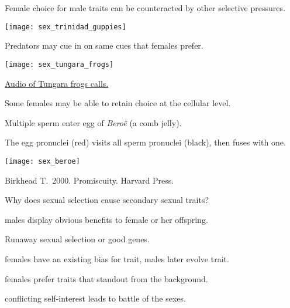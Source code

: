 \documentclass[t]{beamer}
\newcommand{\backskip}{\vspace{-0.5\baselineskip}}
\begin{document}

\begin{frame}{Female choice for male traits can be counteracted by other selective pressures.}

\backskip

\texttt{[image: sex\_trinidad\_guppies]}

\end{frame}


\begin{frame}{Predators may cue in on same cues that females prefer.}

\texttt{[image: sex\_tungara\_frogs]}

\tinyfill \href{https://www.smithsonianmag.com/science-nature/frogs-mating-call-also-attracts-predators-180949463/}{Audio of Tungara frogs calls.}
\end{frame}


\begin{frame}{Some females may be able to retain choice at the cellular level.}

\backskip

\begin{multicols}{2}

\hangpara Multiple sperm enter egg of \textit{Beroë} (a comb jelly).

\hangpara The egg pronuclei (red) visits all sperm pronuclei (black), then fuses with one.

\columnbreak

\vspace*{-2.5\baselineskip}\texttt{[image: sex\_beroe]}

\end{multicols}

\vfilll

\tiny Birkhead T.~2000. Promiscuity. Harvard Press.

\end{frame}


\begin{frame}{Why does sexual selection cause secondary sexual traits?}

\hangpara {} males display obvious benefits to female or her offspring.

\hangpara {} Runaway sexual selection or good genes.

\hangpara {} females have an existing bias for trait, males later evolve trait.

\hangpara {} females prefer traits that standout from the background.

\hangpara {} conflicting self-interest leads to battle of the sexes.

\end{frame}
\end{document}
